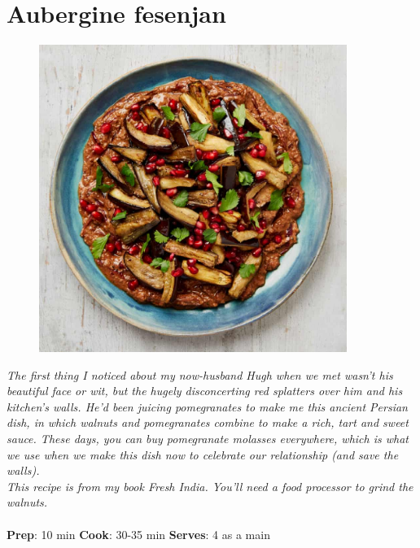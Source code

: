 \documentclass{book}
\begin{document}
\section{Aubergine fesenjan}
\begin{figure}
\centering\includegraphics[width=10cm,height=10cm,keepaspectratio]{Recipe_Pictures/Aubergine_fesenjan.png}
\end{figure}
\emph{The first thing I noticed about my now-husband Hugh when we met wasn’t his beautiful face or wit, but the hugely disconcerting red splatters over him and his kitchen’s walls. He’d been juicing pomegranates to make me this ancient Persian dish, in which walnuts and pomegranates combine to make a rich, tart and sweet sauce. These days, you can buy pomegranate molasses everywhere, which is what we use when we make this dish now to celebrate our relationship (and save the walls).\\ 
This recipe is from my book Fresh India. You’ll need a food processor to grind the walnuts.}\\\\ 
\textbf{Prep}: 10 min
\textbf{Cook}: 30-35 min
\textbf{Serves}: 4 as a main
\end{document}
